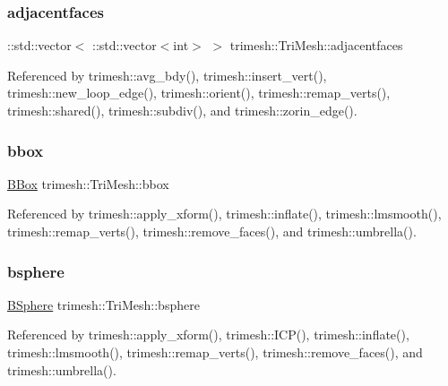 \subsubsection{\texorpdfstring{adjacentfaces}{adjacentfaces}}
{\footnotesize\ttfamily \+::std\+::vector$<$ \+::std\+::vector$<$int$>$ $>$ trimesh\+::\+Tri\+Mesh\+::adjacentfaces}



Referenced by trimesh\+::avg\+\_\+bdy(), trimesh\+::insert\+\_\+vert(), trimesh\+::new\+\_\+loop\+\_\+edge(), trimesh\+::orient(), trimesh\+::remap\+\_\+verts(), trimesh\+::shared(), trimesh\+::subdiv(), and trimesh\+::zorin\+\_\+edge().

\mbox{\label{classtrimesh_1_1TriMesh_a82dbf26f7a507b0a5c0f896c60b7c086}} 
\subsubsection{\texorpdfstring{bbox}{bbox}}
{\footnotesize\ttfamily \hyperlink{classtrimesh_1_1TriMesh_a32708e131e1ccac6238a226edf5a43f6}{B\+Box} trimesh\+::\+Tri\+Mesh\+::bbox}



Referenced by trimesh\+::apply\+\_\+xform(), trimesh\+::inflate(), trimesh\+::lmsmooth(), trimesh\+::remap\+\_\+verts(), trimesh\+::remove\+\_\+faces(), and trimesh\+::umbrella().

\mbox{\label{classtrimesh_1_1TriMesh_a199622d8202df23bab4fb97c78e12587}} 
\subsubsection{\texorpdfstring{bsphere}{bsphere}}
{\footnotesize\ttfamily \hyperlink{structtrimesh_1_1TriMesh_1_1BSphere}{B\+Sphere} trimesh\+::\+Tri\+Mesh\+::bsphere}



Referenced by trimesh\+::apply\+\_\+xform(), trimesh\+::\+I\+C\+P(), trimesh\+::inflate(), trimesh\+::lmsmooth(), trimesh\+::remap\+\_\+verts(), trimesh\+::remove\+\_\+faces(), and trimesh\+::umbrella().

\mbox{\label{classtrimesh_1_1TriMesh_a353e6841e3a3087b844787bf6a04618b}} 
